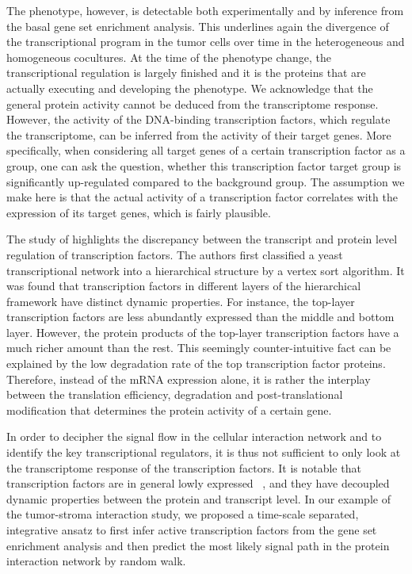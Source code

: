 The phenotype, however, is detectable both experimentally
and by inference from the basal gene set enrichment analysis.
This underlines again the divergence of the transcriptional
program in the tumor cells over time in the heterogeneous
and homogeneous cocultures. At the time of the phenotype
change, the transcriptional regulation is largely finished
and it is the proteins that are actually executing and
developing the phenotype. We acknowledge that the general 
protein
activity cannot be deduced from the transcriptome response.
However, the activity of the DNA-binding transcription
factors, which regulate the transcriptome, can be
inferred from the activity of their target genes.
More specifically, when considering all target genes of
a certain transcription factor as a group, one can ask
the question, whether this transcription factor target
group is significantly up-regulated compared to the
background group. The assumption we make here is that the actual
activity of a transcription factor correlates with 
the expression of its target genes, which is fairly
plausible.

The study of \cite{Jothi2009} highlights the discrepancy
between the transcript and protein level regulation of
transcription factors. The authors first classified a
yeast transcriptional network into a hierarchical
structure by a vertex sort algorithm. It was found that
transcription factors in different layers of the
hierarchical framework have distinct dynamic properties.
For instance, the top-layer transcription factors are
less abundantly expressed than the middle and bottom
layer. However, the protein products of the top-layer
transcription factors have a much richer amount than
the rest. This seemingly counter-intuitive fact can be explained by
the low degradation rate of the top transcription
factor proteins. Therefore, instead of the mRNA 
expression alone, it is rather the interplay between
the translation efficiency, degradation and 
post-translational modification that determines the
protein activity of a certain gene.

In order to decipher the signal flow in the cellular
interaction network and to identify the key 
transcriptional regulators, it is thus not sufficient
to only look at the transcriptome response of the
transcription factors. It is notable that transcription
factors are in general lowly expressed%
~\citep{Vaquerizas2009}, and they have decoupled
dynamic properties between the protein and transcript
level. 
In our example of the tumor-stroma interaction study, 
we proposed a time-scale separated,
integrative ansatz to first infer active 
transcription factors from the gene set enrichment 
analysis and then predict the most likely
signal path in the protein interaction network by 
random walk.

